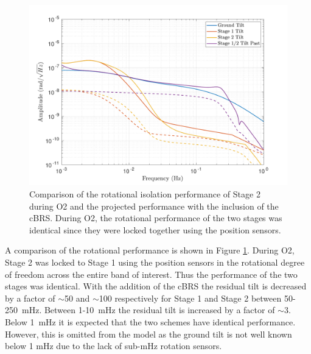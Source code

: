 \documentclass [12pt, proquest]{uwthesis}[2019]
\begin{document}
\begin{figure}[!h]
\begin{center}
\includegraphics[width=\textwidth]{cBRS_Model_CompRX.pdf}
\caption[Comparison of the rotational isolation performance of Stage 2 during O2 and the projected performance with the inclusion of the cBRS]{Comparison of the rotational isolation performance of Stage 2 during O2 and the projected performance with the inclusion of the cBRS. During O2, the rotational performance of the two stages was identical since they were locked together using the position sensors.}
\label{cBRSCompR}
\end{center}
\end{figure}

A comparison of the rotational performance is shown in Figure \ref{cBRSCompR}. During O2, Stage 2 was locked to Stage 1 using the position sensors in the rotational degree of freedom across the entire band of interest. Thus the performance of the two stages was identical. With the addition of the cBRS the residual tilt is decreased by a factor of $\sim$50 and $\sim$100 respectively for Stage 1 and Stage 2 between 50-250~mHz. Between 1-10~mHz the residual tilt is increased by a factor of $\sim$3. Below 1~mHz it is expected that the two schemes have identical performance. However,  this is omitted from the model as the ground tilt is not well known below 1 mHz due to the lack of sub-mHz rotation sensors.
\end{document}
